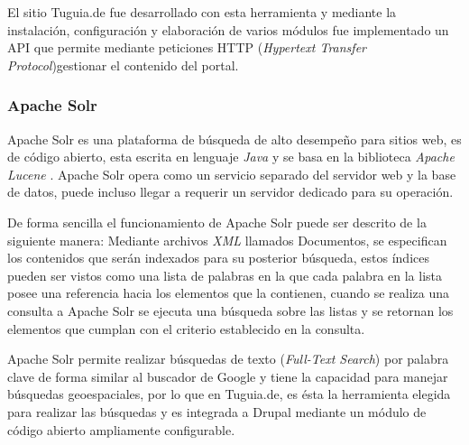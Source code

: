 El sitio Tuguia.de fue desarrollado con esta herramienta y mediante la instalación, configuración y elaboración de varios módulos fue implementado un API que permite mediante peticiones HTTP (\textit{Hypertext Transfer Protocol})gestionar el contenido del portal.

\subsubsection{Apache Solr} \label{subsubsect:solr}

Apache Solr es una plataforma de búsqueda de alto desempeño para sitios web, es de código abierto, esta escrita en lenguaje \textit{Java} y se basa en la biblioteca \textit{Apache Lucene} \cite{APS}. Apache Solr opera como un servicio separado del servidor web y la base de datos, puede incluso llegar a requerir un servidor dedicado para su operación. 

De forma sencilla el funcionamiento de Apache Solr puede ser descrito de la siguiente manera: Mediante archivos \textit{XML} llamados Documentos, se especifican los contenidos que serán indexados para su posterior búsqueda, estos índices pueden ser vistos como una lista de palabras en la que cada palabra en la lista posee una referencia hacia los elementos que la contienen, cuando se realiza una consulta a Apache Solr se ejecuta una búsqueda sobre las listas y se retornan los elementos que cumplan con el criterio establecido en la consulta.

Apache Solr permite realizar búsquedas de texto (\textit{Full-Text Search}) por palabra clave de forma similar al buscador de Google y tiene la capacidad para manejar búsquedas geoespaciales, por lo que en Tuguia.de, es ésta la herramienta elegida para realizar las búsquedas y es integrada a Drupal mediante un módulo de código abierto ampliamente configurable.  
